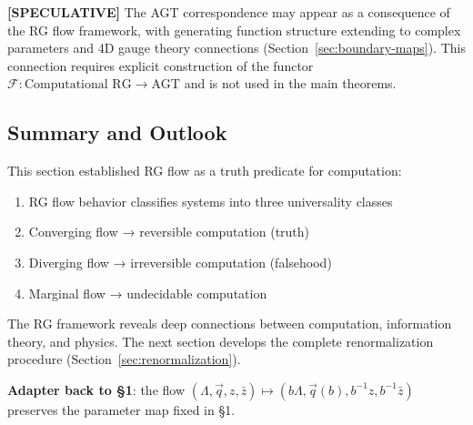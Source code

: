 \begin{remark}
\label{rem:agt-consequence}
\textbf{[SPECULATIVE]} The AGT correspondence may appear as a consequence of the RG flow framework, with generating function structure extending to complex parameters and 4D gauge theory connections (Section~\ref{sec:boundary-maps}). This connection requires explicit construction of the functor $\mathcal{F}: \text{Computational RG} \to \text{AGT}$ and is not used in the main theorems.
\end{remark}

\subsection{Summary and Outlook}

This section established RG flow as a truth predicate for computation:

\begin{enumerate}
\item RG flow behavior classifies systems into three universality classes
\item Converging flow → reversible computation (truth)
\item Diverging flow → irreversible computation (falsehood)  
\item Marginal flow → undecidable computation
\end{enumerate}

The RG framework reveals deep connections between computation, information theory, and physics. The next section develops the complete renormalization procedure (Section~\ref{sec:renormalization}).

\textbf{Adapter back to §1}: the flow $(\Lambda,\vec{q},z,\bar{z})\mapsto (b\Lambda,\vec{q}(b),b^{-1}z,b^{-1}\bar{z})$ preserves the parameter map fixed in §1.